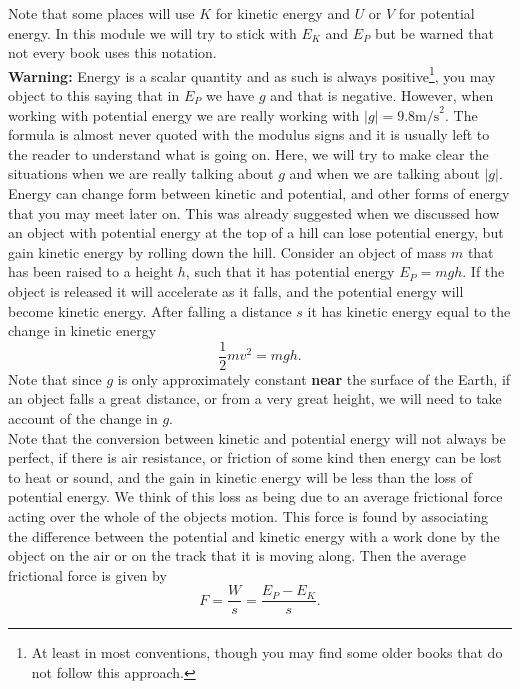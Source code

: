 Note that some places will use $K$ for   kinetic energy and $U$ or $V$ for potential energy. In this module we will try to stick with $E_{K}$ and $E_{P}$ but be warned that not every book uses this notation.\\

\textbf{Warning:} Energy is a scalar quantity and as such is always positive\footnote{At least in most conventions, though you may find some older books that do not follow this approach.}, you may object to this saying that in $E_{P}$ we have $g$ and that is negative. However, when working with potential energy we are really working with $\vert g\vert =9.8\text{m/s}^{2}$. The formula is almost never quoted with the modulus signs and it is usually left to the reader to understand what is going on. Here, we will try to make clear the situations when we are really talking about $g$ and when we are talking about $\vert g\vert$.\\

Energy can change form between kinetic and potential, and other forms of energy that you may meet later on.  This was already suggested when we discussed how an object with potential energy at the top of a hill can lose potential energy, but gain kinetic energy by rolling down the hill. Consider an object of mass $m$ that has been raised to a height $h$, such that it has potential energy $E_{P}=mgh$. If the object is released it will accelerate as it falls, and the potential energy will become kinetic energy. After falling a distance $s$ it has kinetic energy equal to the change in kinetic energy
\begin{equation*}
\frac{1}{2}mv^{2}=mg h.
\end{equation*}
Note that since $g$ is only approximately constant \textbf{near} the surface of the Earth, if an object falls a great distance, or from a very great height, we will need to take account of the change in $g$.\\

Note that the conversion between kinetic and potential energy will not always be perfect, if there is air resistance, or friction of some kind then energy can be lost to heat or sound, and the gain in kinetic energy will be less than the loss of potential energy. We think of this loss as being due to an average frictional force acting over the whole of the objects motion. This force is found by associating the difference between the potential and kinetic energy with a work done by the object on the air or on the track that it is moving along. Then the average frictional force is given by
\begin{equation*}
F=\frac{W}{s}=\frac{E_{P}-E_{K}}{s}.
\end{equation*}

